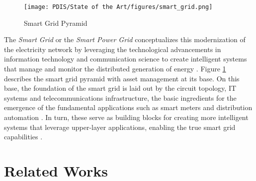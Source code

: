 \documentclass[11pt,a4paper]{article}
\begin{document}
\begin{figure}[h!]
    \centering
    \texttt{[image: PDIS/State of the Art/figures/smart\_grid.png]}
    \caption{Smart Grid Pyramid \cite{farhangiPathSmartGrid2010}}
    \label{fig:smart-grid}
\end{figure}


The \textit{Smart Grid} or the \textit{Smart Power Grid} conceptualizes this modernization of the electricity network by leveraging the technological advancements in information technology and communication science to create intelligent systems that manage and monitor the distributed generation of energy \cite{bayindirSmartGridTechnologies2016, farhangiPathSmartGrid2010}. Figure \ref{fig:smart-grid} describes the smart grid pyramid with asset management at its base. On this base, the foundation of the smart grid is laid out by the circuit topology, \acs{IT} systems and telecommunications infrastructure, the basic ingredients for the emergence of the fundamental applications such as smart meters and distribution automation \cite{farhangiPathSmartGrid2010}. In turn, these serve as building blocks for creating more intelligent systems that leverage upper-layer applications, enabling the true smart grid capabilities \cite{farhangiPathSmartGrid2010}.


\section{Related Works}
\end{document}
